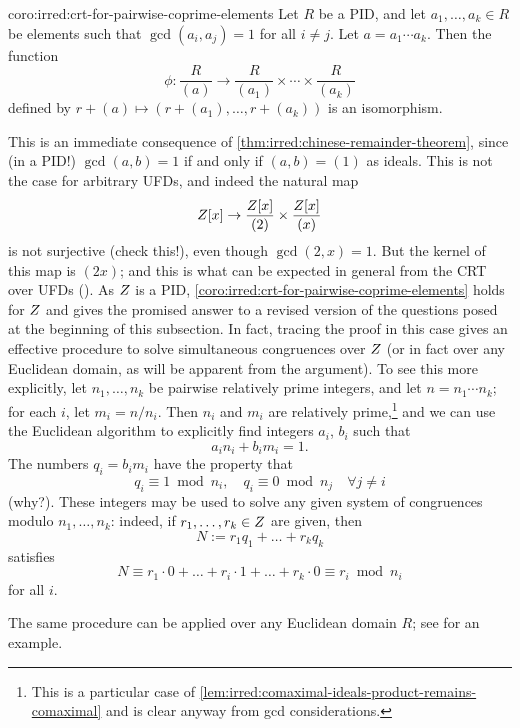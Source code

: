 \begin{coro}{}{coro:irred:crt-for-pairwise-coprime-elements}
  Let $R$ be a PID, and let $a_1, \dots, a_k \in R$ be elements such
  that $\gcd(a_i, a_j) = 1$ for all $i \neq j$. Let
  $a = a_1 \cdots a_k$. Then the function
  \[\phi : \frac{R}{(a)} \to
    \frac{R}{(a_1)} \times \cdots \times \frac{R}{(a_k)}\] defined by
  $r + (a) \mapsto (r + (a_1), \dots, r + (a_k))$ is an isomorphism.
\end{coro}
This is an immediate consequence of \cref{thm:irred:chinese-remainder-theorem}, since (in a
PID!)  $\gcd(a, b) = 1$ if and only if $(a, b) = (1)$ as ideals. This
is not the case for arbitrary UFDs, and indeed the natural map
\[Z[x] \to \frac{Z[x]}{(2)} \times
  \frac{Z[x]}{(x)}\] is not surjective (check this!), even though
$\gcd(2, x) = 1$. But the kernel of this map is $(2x)$; and this is
what can be expected in general from the CRT over UFDs
().  As
$Z$ is a PID, \cref{coro:irred:crt-for-pairwise-coprime-elements} holds for $Z$ and gives the
promised answer to a revised version of the questions posed at the
beginning of this subsection. In fact, tracing the proof in this case
gives an effective procedure to solve simultaneous congruences over
$Z$ (or in fact over any Euclidean domain, as will be apparent from
the argument).  To see this more explicitly, let $n_1, \dots, n_k$ be
pairwise relatively prime integers, and let $n = n_1 \cdots n_k$; for
each $i$, let $m_i = n/n_i$. Then $n_i$ and $m_i$ are relatively
prime,\footnote{This is a particular case of \cref{lem:irred:comaximal-ideals-product-remains-comaximal} and
  is clear anyway from gcd considerations.}  and we can use the
Euclidean algorithm to explicitly find integers $a_i$, $b_i$ such that
\[a_i n_i + b_i m_i = 1.\] The numbers $q_i = b_i m_i$ have the
property that
\[q_i \equiv 1 \bmod n_i, \quad q_i \equiv 0 \bmod n_j \quad \forall j
  \neq i\] (why?). These integers may be used to solve any given
system of congruences modulo $n_1, \dots, n_k$: indeed, if
$r_1, \dots, r_k \in Z$ are given, then
\[N := r_1 q_1 + \dots + r_k q_k\] satisfies
\[N \equiv r_1 \cdot 0 + \dots + r_i \cdot 1 + \dots + r_k \cdot 0
  \equiv r_i \bmod n_i\] for all $i$.

The same procedure can be applied over any Euclidean domain $R$; see
 for an example.

